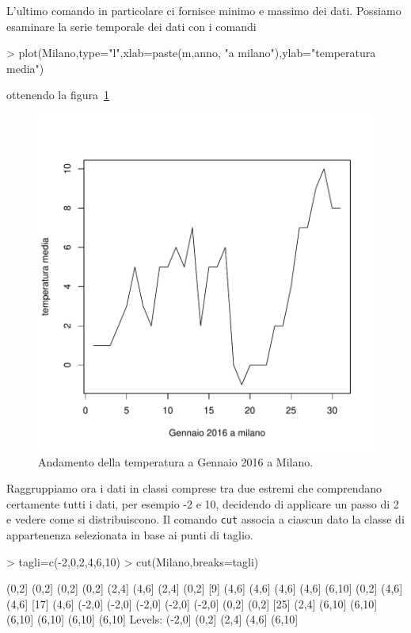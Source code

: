 \documentclass[onecolumn,12pt]{book}
\begin{document}
L'ultimo comando in particolare ci fornisce minimo e massimo dei dati.
Possiamo esaminare la serie temporale dei dati con i comandi
\begin{Schunk}
\begin{Sinput}
> plot(Milano,type="l",xlab=paste(m,anno, "a milano"),ylab="temperatura media")
\end{Sinput}
\end{Schunk}
ottenendo la figura~\ref{fig:datiist}
\begin{figure}[htbp]
\begin{center}
\includegraphics{RbookParte2-030}
\caption{ Andamento della temperatura a Gennaio 2016  a Milano. }
\label{fig:datiist}
\end{center}
\end{figure}

Raggruppiamo ora i dati in classi comprese  tra due estremi che comprendano certamente tutti i dati, per esempio -2 e 10, decidendo di applicare un passo di 2 e vedere come si distribuiscono. Il comando \texttt{cut} associa a ciascun dato la classe di appartenenza selezionata in base ai punti di taglio.

\begin{Schunk}
\begin{Sinput}
> tagli=c(-2,0,2,4,6,10)
> cut(Milano,breaks=tagli)
\end{Sinput}
\begin{Soutput}
 [1] (0,2]  (0,2]  (0,2]  (0,2]  (2,4]  (4,6]  (2,4]  (0,2] 
 [9] (4,6]  (4,6]  (4,6]  (4,6]  (6,10] (0,2]  (4,6]  (4,6] 
[17] (4,6]  (-2,0] (-2,0] (-2,0] (-2,0] (-2,0] (0,2]  (0,2] 
[25] (2,4]  (6,10] (6,10] (6,10] (6,10] (6,10] (6,10]
Levels: (-2,0] (0,2] (2,4] (4,6] (6,10]
\end{Soutput}
\end{Schunk}
\end{document}

